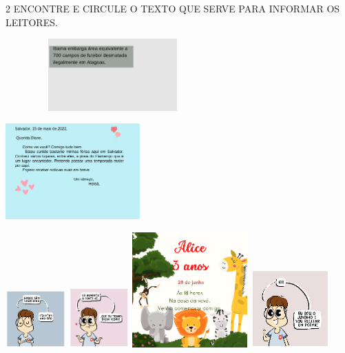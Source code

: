 \num{2} ENCONTRE E CIRCULE O TEXTO QUE SERVE PARA INFORMAR OS LEITORES. 

\includegraphics[width=3.23889in,height=1.08958in]{media/image141.png}

\includegraphics[width=2.03472in,height=1.44444in]{media/image142.png}

\includegraphics[width=0.90835in,height=0.87172in]{media/image143.png}
\includegraphics[width=0.90912in,height=0.90912in]{media/image145.png}
\includegraphics[width=1.74653in,height=1.74653in]{media/image147.png}
\includegraphics[width=1.18333in,height=1.18333in]{media/image152.png}

